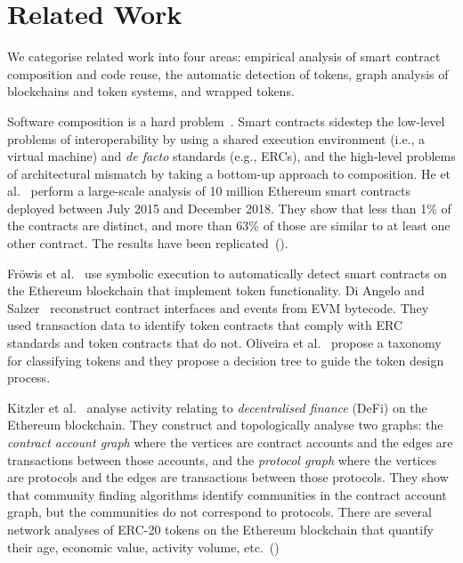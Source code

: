 \section{Related Work}\label{sec:related-work}

We categorise related work into four areas: empirical analysis of
smart contract composition and code reuse, the automatic detection of
tokens, graph analysis of blockchains and token systems, and wrapped
tokens.

Software composition is a hard problem~\cite{garlan-et-al-94}.  Smart
contracts sidestep the low-level problems of interoperability by using
a shared execution environment (i.e., a virtual machine) and
\textit{de facto} standards (e.g., ERCs), and the high-level problems
of architectural mismatch by taking a bottom-up approach to
composition.  He et al.~\cite{he-et-al-20} perform a large-scale
analysis of \num{10} million Ethereum smart contracts deployed between
July 2015 and December 2018.  They show that less than \num{1}\% of
the contracts are distinct, and more than \num{63}\% of those are
similar to at least one other contract.  The results have been
replicated~(\hspace{1sp}\cite{kondo-et-al-20,chen-et-al-21,khan-et-al-22}).

Fr\"owis et al.~\cite{frowis-et-al-19} use symbolic execution to
automatically detect smart contracts on the Ethereum blockchain that
implement token functionality.  Di Angelo and
Salzer~\cite{di-angelo-salzer-21} reconstruct contract interfaces and
events from EVM bytecode.  They used transaction data to identify
token contracts that comply with ERC standards and token contracts
that do not.  Oliveira et al.~\cite{oliveira-et-al-18} propose a
taxonomy for classifying tokens and they propose a decision tree to
guide the token design process.

Kitzler et al.~\cite{kitzler-et-al-21} analyse activity relating to
\textit{decentralised finance} (DeFi) on the Ethereum blockchain.
They construct and topologically analyse two graphs: the
\textit{contract account graph} where the vertices are contract
accounts and the edges are transactions between those accounts, and
the \textit{protocol graph} where the vertices are protocols and the
edges are transactions between those protocols.  They show that
community finding algorithms identify communities in the contract
account graph, but the communities do not correspond to protocols.
There are several network analyses of ERC-20 tokens on the Ethereum
blockchain that quantify their age, economic value, activity volume,
etc.~(\hspace{1sp}\cite{somin-et-al-18,victor-luders-19})

